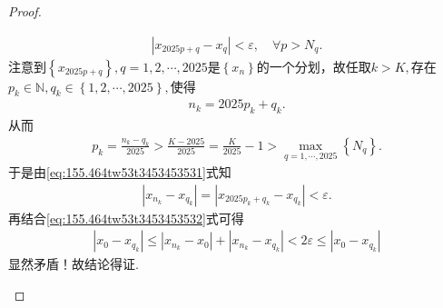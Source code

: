 \documentclass[../../main.tex]{subfiles}
\begin{document}
\begin{proof}
\begin{enumerate}
\begin{align}
\left| x_{2025p+q}-x_q \right|<\varepsilon ,\quad \forall p>N_q.\label{eq:155.464tw53t3453453531}
\end{align}
注意到$\left\{ x_{2025p+q} \right\},q=1,2,\cdots ,2025$是$\left\{ x_n \right\}$的一个分划，故任取$k>K,$存在$p_k\in \mathbb{N},q_k\in \left\{ 1,2,\cdots ,2025 \right\},$使得
\begin{align*}
n_k=2025p_k+q_k.
\end{align*}
从而
\begin{align*}
p_k=\frac{n_k-q_k}{2025}>\frac{K-2025}{2025}=\frac{K}{2025}-1>\underset{q=1,\cdots ,2025}{\max}\left\{ N_q \right\}.
\end{align*}
于是由\eqref{eq:155.464tw53t3453453531}式知
\begin{align*}
\left| x_{n_k}-x_{q_k} \right|=\left| x_{2025p_k+q_k}-x_{q_k} \right|<\varepsilon .
\end{align*}
再结合\eqref{eq:155.464tw53t3453453532}式可得
\begin{align*}
\left| x_0-x_{q_k} \right|\leqslant \left| x_{n_k}-x_0 \right|+\left| x_{n_k}-x_{q_k} \right|<2\varepsilon \leqslant \left| x_0-x_{q_k} \right|
\end{align*}
显然矛盾！故结论得证.
\end{enumerate}
\end{proof}
\end{document}
